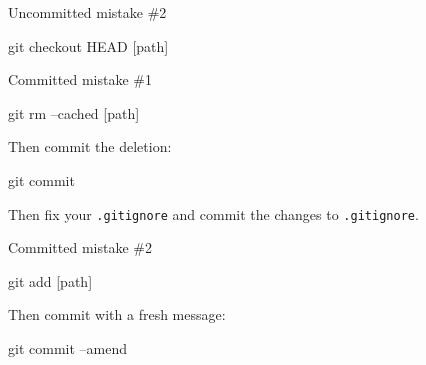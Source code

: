\begin{frame}[fragile]{Uncommitted mistake \#2}

  \color{ucMaroon}{I modified one file incorrectly but didn't commit. Can I
  restore just that one file?}

  \qquad

  \begin{gitCommand}git checkout HEAD [path]\end{gitCommand}
\end{frame}

\begin{frame}[fragile]{Committed mistake \#1}

  \color{ucMaroon}{I forgot to ignore something, and now it has changed and is
  chasing me around.}

  \qquad

  \color{black}{First, mark it for deletion in the staging area only:}

  \begin{gitCommand}git rm --cached [path]\end{gitCommand}

  Then commit the deletion:

  \begin{gitCommand}git commit\end{gitCommand}

  Then fix your \texttt{.gitignore} and commit the changes to \texttt{.gitignore}.

\end{frame}

\begin{frame}[fragile]{Committed mistake \#2}

  \color{ucMaroon}{My most recent commit is half-baked. Can I bake it better?}

  \qquad

  \color{black}{Stage your corrections:}

  \begin{gitCommand}git add [path]\end{gitCommand}

  Then commit with a fresh message:

  \begin{gitCommand}git commit --amend\end{gitCommand}
\end{frame}

